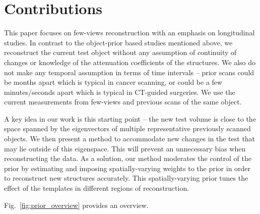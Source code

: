 \documentclass[journal]{IEEEtran}
\begin{document}

\section{Contributions}
\label{sec:contributions}
This paper focuses on few-views reconstruction with an emphasis on
longitudinal studies. In contrast to the object-prior based studies
mentioned above, we reconstruct the current test object without any
assumption of continuity of changes or knowledge of the attenuation
coefficients of the structures. We also do not make any temporal
assumption in terms of time intervals -- prior scans could be months
apart which is typical in cancer scanning, or could be a few
minutes/seconds apart which is typical in CT-guided surgeries. We use
the current measurements from few-views and previous scans of the same
object.

A key idea in our work is this starting
point -- the new test volume is close to the space spanned by the
eigenvectors of multiple representative previously scanned objects.
We then present a method to accommodate new changes in the test that
may lie outside of this eigenspace. This will prevent an unnecessary
bias when reconstructing the data. As a solution, our method moderates
the control of the prior by estimating and imposing spatially-varying
weights to the prior in order to reconstruct new structures
accurately. This spatially-varying prior tunes the effect of the
templates in different regions of reconstruction.

Fig.~\ref{fig:prior_overview} provides an overview.

\end{document}
